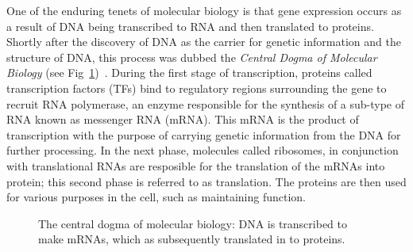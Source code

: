         One of the enduring tenets of molecular biology is that gene expression occurs as a result of DNA being transcribed to RNA and then translated to proteins. Shortly after the discovery of DNA as the carrier for genetic information and the structure of DNA, this process was dubbed the \emph{Central Dogma of Molecular Biology} (see Fig~\ref{fig:centralDogma})~\cite{crick1958protein, macleod1944studies, watson1953structure}. During the first stage of transcription, proteins called transcription factors (TFs) bind to regulatory regions surrounding the gene to recruit RNA polymerase, an enzyme responsible for the synthesis of a sub-type of RNA known as messenger RNA (mRNA). This mRNA is the product of transcription with the purpose of carrying genetic information from the DNA for further processing. In the next phase, molecules called ribosomes, in conjunction with translational RNAs are resposible for the translation of the mRNAs into protein; this second phase is referred to as translation. The proteins are then used for various purposes in the cell, such as maintaining function. %
        
        \begin{figure}
            \centering
            \centering
            \caption{The central dogma of molecular biology: DNA is transcribed to make mRNAs, which as subsequently translated in to proteins.}
            \label{fig:centralDogma}
        \end{figure}
        

